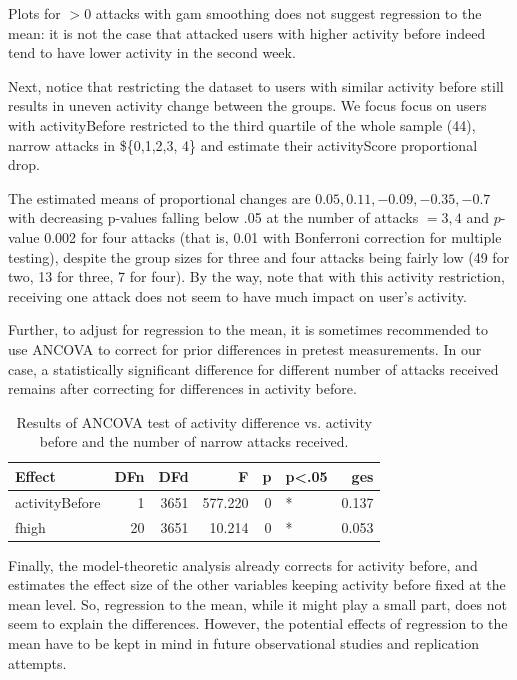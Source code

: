 \documentclass[10pt,]{scrartcl}
\begin{document}
Plots for \(>0\) attacks with gam smoothing does not suggest regression
to the mean: it is not the case that attacked users with higher activity
before indeed tend to have lower activity in the second week.

Next, notice that restricting the dataset to users with similar activity
before still results in uneven activity change between the groups. We
focus focus on users with \textsf{activityBefore} restricted to the
third quartile of the whole sample (44), narrow attacks in \$\{0,1,2,3,
4\} and estimate their \textsf{activityScore} proportional drop.

\normalsize  The estimated means of proportional changes are
\(0.05, 0.11, -0.09,-0.35, -0.7\) with decreasing p-values falling below
.05 at the number of attacks \(=3, 4\) and \(p\)-value 0.002 for four
attacks (that is, 0.01 with Bonferroni correction for multiple testing),
despite the group sizes for three and four attacks being fairly low (49
for two, 13 for three, 7 for four). By the way, note that with this
activity restriction, receiving one attack does not seem to have much
impact on user's activity.

Further, to adjust for regression to the mean, it is sometimes
recommended to use ANCOVA to correct for prior differences in pretest
measurements. In our case, a statistically significant difference for
different number of attacks received remains after correcting for
differences in activity before.

\begin{table}
\footnotesize

\begin{tabular}{l|r|r|r|r|l|r}
\hline
Effect & DFn & DFd & F & p & p<.05 & ges\\
\hline
activityBefore & 1 & 3651 & 577.220 & 0 & * & 0.137\\
\hline
fhigh & 20 & 3651 & 10.214 & 0 & * & 0.053\\
\hline
\end{tabular}
\normalsize 
\caption{Results of ANCOVA test of activity difference vs. activity before and the number of narrow attacks received.}
\end{table}

Finally, the model-theoretic analysis already corrects for activity
before, and estimates the effect size of the other variables keeping
activity before fixed at the mean level. So, regression to the mean,
while it might play a small part, does not seem to explain the
differences. However, the potential effects of regression to the mean
have to be kept in mind in future observational studies and replication
attempts.
\end{document}
